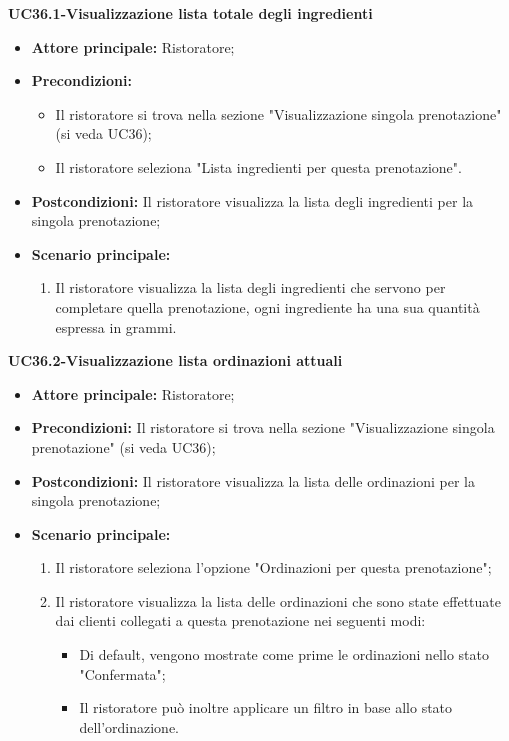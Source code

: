 \textbf{UC36.1-Visualizzazione lista totale degli ingredienti}
\begin{itemize}
    \item \textbf{Attore principale:} Ristoratore;
    \item \textbf{Precondizioni:}
    \begin{itemize}
        \item Il ristoratore si trova nella sezione "Visualizzazione singola prenotazione" (si veda UC36);
        \item Il ristoratore seleziona "Lista ingredienti per questa prenotazione".
    \end{itemize}
    \item \textbf{Postcondizioni:} Il ristoratore visualizza la lista degli ingredienti per la singola prenotazione;
    \item \textbf{Scenario principale:}
    \begin{enumerate}
        \item Il ristoratore visualizza la lista degli ingredienti che servono per completare quella prenotazione, ogni ingrediente ha una sua quantità espressa in grammi.
    \end{enumerate}
\end{itemize}

\textbf{UC36.2-Visualizzazione lista ordinazioni attuali}
\begin{itemize}
    \item \textbf{Attore principale:} Ristoratore;
    \item \textbf{Precondizioni:} Il ristoratore si trova nella sezione "Visualizzazione singola prenotazione" (si veda UC36);
    \item \textbf{Postcondizioni:} Il ristoratore visualizza la lista delle ordinazioni per la singola prenotazione;
    \item \textbf{Scenario principale:}
    \begin{enumerate}
        \item Il ristoratore seleziona l'opzione "Ordinazioni per questa prenotazione";
        \item Il ristoratore visualizza la lista delle ordinazioni che sono state effettuate dai clienti collegati a questa prenotazione nei seguenti modi:
        \begin{itemize}
            \item Di default, vengono mostrate come prime le ordinazioni nello stato "Confermata";
            \item Il ristoratore può inoltre applicare un filtro in base allo stato dell'ordinazione.
        \end{itemize}
    \end{enumerate}
\end{itemize}

